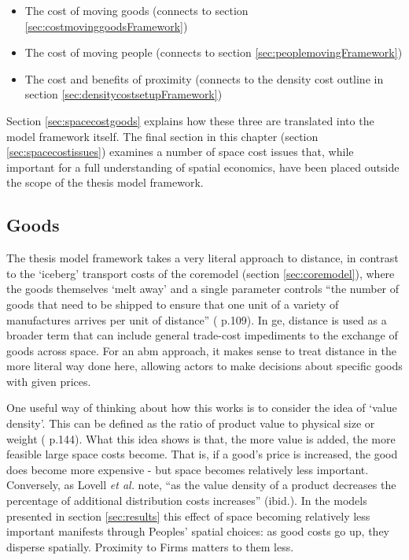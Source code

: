 {\begin{itemize}
	\item The cost of moving goods (connects to section \ref{sec:costmovinggoodsFramework})
	\item The cost of moving people (connects to section \ref{sec:peoplemovingFramework})
	\item The cost and benefits of proximity (connects to the density cost outline in section \ref{sec:densitycostsetupFramework})
\end{itemize}

Section \ref{sec:spacecostgoods} explains how these three are translated into the model framework itself. The final section in this chapter (section \ref{sec:spacecostissues}) examines a number of space cost issues that, while important for a full understanding of spatial economics, have been placed outside the scope of the thesis model framework. 

\subsection{Goods \label{sec:costmovinggoods}}

The thesis model framework takes a very literal approach to distance, in contrast to the `iceberg' transport costs of the \gls{coremodel} (section \ref{sec:coremodel}), where the goods themselves `melt away' and a single parameter controls ``the number of goods that need to be shipped to ensure that one unit of a variety of manufactures arrives per unit of distance'' (\citealt{brakman_new_2009} p.109). In \gls{ge}, distance is used as a broader term that can include general trade-cost impediments to the exchange of goods across space. For an \gls{abm} approach, it makes sense to treat distance in the more literal way done here, allowing actors to make decisions about specific goods with given prices.

One useful way of thinking about how this works is to consider the idea of `value density'. This can be defined as the ratio of product value to physical size or weight (\citealt{lovell_product_2005} p.144). What this idea shows is that, the more value is added, the more feasible large space costs become. That is, if a good's price is increased, the good does become more expensive - but space becomes relatively less important. Conversely, as Lovell \emph{et al.} note, ``as the value density of a product decreases the percentage of additional distribution costs increases'' (ibid.). In the models presented in section \ref{sec:results} this effect of space becoming relatively less important manifests through Peoples' spatial choices: as good costs go up, they disperse spatially.  Proximity to Firms matters to them less.

}
